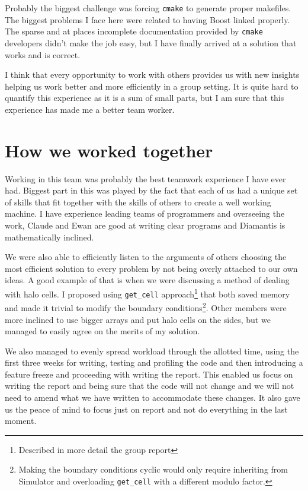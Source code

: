 \documentclass[11pt,a4paper]{article}
\begin{document}
Probably the biggest challenge was forcing \texttt{cmake} to generate proper makefiles. The biggest problems I face here were related to having Boost linked properly. The sparse and at places incomplete documentation provided by \texttt{cmake} developers didn't make the job easy, but I have finally arrived at a solution that works and is correct.

I think that every opportunity to work with others provides us with new insights helping us work better and more efficiently in a group setting. It is quite hard to quantify this experience as it is a sum of small parts, but I am sure that this experience has made me a better team worker.

\section{How we worked together}
Working in this team was probably the best teamwork experience I have ever had. Biggest part in this was played by the fact that each of us had a unique set of skills that fit together with the skills of others to create a well working machine. I have experience leading teams of programmers and overseeing the work, Claude and Ewan are good at writing clear programs and Diamantis is mathematically inclined.

We were also able to efficiently listen to the arguments of others choosing the most efficient solution to every problem by not being overly attached to our own ideas. 
A good example of that is when we were discussing a method of dealing with halo cells. 
I proposed using \texttt{get\_cell} approach\footnote{Described in more detail the group report} that both saved memory and made it trivial to modify the boundary conditions\footnote{Making the boundary conditions cyclic would only require inheriting from Simulator and overloading \texttt{get\_cell} with a different modulo factor.}. 
Other members were more inclined to use bigger arrays and put halo cells on the sides, but we managed to easily agree on the merits of my solution. 

We also managed to evenly spread workload through the allotted time, using the first three weeks for writing, testing and profiling the code and then introducing a feature freeze and proceeding with writing the report. This enabled us focus on writing the report and being sure that the code will not change and we will not need to amend what we have written to accommodate these changes. It also gave us the peace of mind to focus just on report and not do everything in the last moment.
\end{document}
